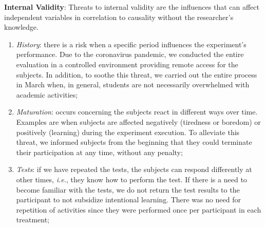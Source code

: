 \textbf{Internal Validity}: 
Threats to internal validity are the influences that can affect independent variables in correlation to causality without the researcher's knowledge.
\begin{enumerate} [label=\roman*.]
    \item \textit{History}: there is a risk when a specific period influences the experiment's performance. Due to the coronavirus pandemic, we conducted the entire evaluation in a controlled environment providing remote access for the subjects. 
    In addition, to soothe this threat, we carried out the entire process in March when, in general, students are not necessarily overwhelmed with academic activities;
    
    \item \textit{Maturation}: occurs concerning the subjects react in different ways over time. 
    Examples are when subjects are affected negatively (tiredness or boredom) or positively (learning) during the experiment execution.
    To alleviate this threat, we informed subjects from the beginning that they could terminate their participation at any time, without any penalty;
    
    \item \textit{Tests}: 
    if we have repeated the tests, the subjects can respond differently at other times, \textit{i.e.}, they know how to perform the test. 
    If there is a need to become familiar with the tests, we do not return the test results to the participant to not subsidize intentional learning. 
    There was no need for repetition of activities since they were performed once per participant in each treatment;
    

\end{enumerate}
